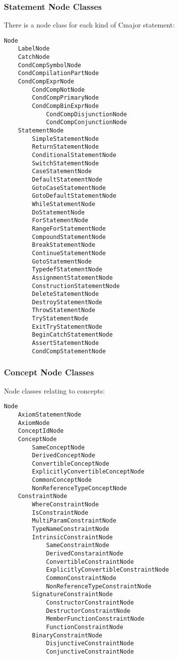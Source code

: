 \documentclass[a4paper,oneside,11pt]{book}
\theoremstyle{definition}
\begin{document}
\subsubsection{Statement Node Classes}

There is a node class for each kind of Cmajor statement:

\begin{verbatim}
Node
    LabelNode
    CatchNode
    CondCompSymbolNode
    CondCompilationPartNode
    CondCompExprNode
        CondCompNotNode
        CondCompPrimaryNode
        CondCompBinExprNode
            CondCompDisjunctionNode
            CondCompConjunctionNode
    StatementNode
        SimpleStatementNode
        ReturnStatementNode
        ConditionalStatementNode
        SwitchStatementNode
        CaseStatementNode
        DefaultStatementNode
        GotoCaseStatementNode
        GotoDefaultStatementNode
        WhileStatementNode
        DoStatementNode
        ForStatementNode
        RangeForStatementNode
        CompoundStatementNode
        BreakStatementNode
        ContinueStatementNode
        GotoStatementNode
        TypedefStatementNode
        AssignmentStatementNode
        ConstructionStatementNode
        DeleteStatementNode
        DestroyStatementNode
        ThrowStatementNode
        TryStatementNode
        ExitTryStatementNode
        BeginCatchStatementNode
        AssertStatementNode
        CondCompStatementNode
\end{verbatim}

\subsubsection{Concept Node Classes}

Node classes relating to concepts:

\begin{verbatim}
Node
    AxiomStatementNode
    AxiomNode
    ConceptIdNode
    ConceptNode
        SameConceptNode
        DerivedConceptNode
        ConvertibleConceptNode
        ExplicitlyConvertibleConceptNode
        CommonConceptNode
        NonReferenceTypeConceptNode
    ConstraintNode
        WhereConstraintNode
        IsConstraintNode
        MultiParamConstraintNode
        TypeNameConstraintNode
        IntrinsicConstraintNode
            SameConstraintNode
            DerivedConstaraintNode
            ConvertibleConstraintNode
            ExplicitlyConvertibleConstraintNode
            CommonConstraintNode
            NonReferenceTypeConstraintNode
        SignatureConstraintNode
            ConstructorConstraintNode
            DestructorConstraintNode
            MemberFunctionConstraintNode
            FunctionConstraintNode
        BinaryConstraintNode
            DisjunctiveConstraintNode
            ConjunctiveConstraintNode
\end{verbatim}
\end{document}
